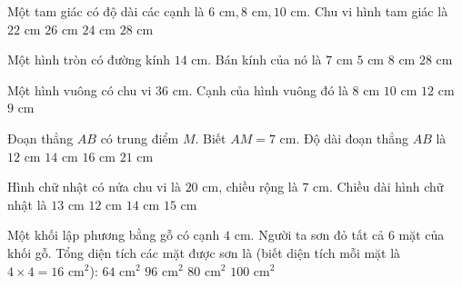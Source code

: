 \begin{ex} %
Một tam giác có độ dài các cạnh là $6\text{ cm}, 8\text{ cm}, 10\text{ cm}$. Chu vi hình tam giác là
\choice
{$22\text{ cm}$}
{$26\text{ cm}$}
{\True $24\text{ cm}$}
{$28\text{ cm}$}
\end{ex}

\begin{ex} %
Một hình tròn có đường kính $14\text{ cm}$. Bán kính của nó là
\choice
{\True $7\text{ cm}$}
{$5\text{ cm}$}
{$8\text{ cm}$}
{$28\text{ cm}$}
\end{ex}

\begin{ex} %
Một hình vuông có chu vi $36\text{ cm}$. Cạnh của hình vuông đó là
\choice
{$8\text{ cm}$}
{$10\text{ cm}$}
{$12\text{ cm}$}
{\True $9\text{ cm}$}
\end{ex}

\begin{ex} %
Đoạn thẳng $AB$ có trung điểm $M$. Biết $AM = 7\text{ cm}$. Độ dài đoạn thẳng $AB$ là
\choice
{$12\text{ cm}$}
{\True $14\text{ cm}$}
{$16\text{ cm}$}
{$21\text{ cm}$}
\end{ex}

\begin{ex} %
Hình chữ nhật có nửa chu vi là $20\text{ cm}$, chiều rộng là $7\text{ cm}$. Chiều dài hình chữ nhật là
\choice
{\True $13\text{ cm}$}
{$12\text{ cm}$}
{$14\text{ cm}$}
{$15\text{ cm}$}
\end{ex}

\begin{ex} %
Một khối lập phương bằng gỗ có cạnh $4\text{ cm}$. Người ta sơn đỏ tất cả 6 mặt của khối gỗ. Tổng diện tích các mặt được sơn là (biết diện tích mỗi mặt là $4 \times 4 = 16\text{ cm}^2$):
\choice
{$64\text{ cm}^2$}
{\True $96\text{ cm}^2$}
{$80\text{ cm}^2$}
{$100\text{ cm}^2$}
\end{ex}

